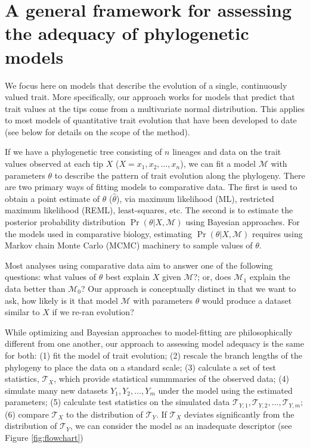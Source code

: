 \section{A general framework for assessing the adequacy of phylogenetic models}

We focus here on models that describe the evolution of a single, continuously valued trait. More specifically, our approach works for models that predict that trait values at the tips come from a multivariate normal distribution. This applies to most models of quantitative trait evolution that have been developed to date (see below for details on the scope of the method).

If we have a phylogenetic tree consisting of $n$ lineages and data on the trait values observed at each tip $X$ ($X=x_1, x_2, \ldots, x_n$), we can fit a model $\mathcal{M}$ with parameters $\theta$ to describe the pattern of trait evolution along the phylogeny. There are two primary ways of fitting models to comparative data. The first is used to obtain a point estimate of $\theta$ ($\hat \theta$), via maximum likelihood (ML), restricted maximum likelihood (REML), least-squares, etc. The second is to estimate the posterior probability distribution $\Pr(\theta|X, \mathcal{M})$ using Bayesian approaches.
For the models used in comparative biology, estimating $\Pr(\theta|X, \mathcal{M})$ requires using Markov chain Monte Carlo (MCMC) machinery to sample values of $\theta$.

Most analyses using comparative data aim to answer one of the following questions: what values of $\theta$ best explain $X$ given $\mathcal{M}$?; or, does $\mathcal{M}_1$ explain the data better than $\mathcal{M}_0$? 
Our approach is conceptually distinct in that we want to ask, how likely is it that model $\mathcal{M}$ with parameters $\theta$ would produce a dataset similar to $X$ if we re-ran evolution?   

While optimizing and Bayesian approaches to model-fitting are philosophically different from one another, our approach to assessing model adequacy is the same for both: (1) fit the model of trait evolution; (2) rescale the branch lengths of the phylogeny to place the data on a standard scale; (3) calculate a set of test statistics, $\mathcal{T}_X$, which provide statistical summmaries of the observed data; (4) simulate many new datasets $Y_1, Y_2, \ldots, Y_m$ under the model using the estimated parameters; (5) calculate test statistics on the simulated data $\mathcal{T}_{Y,1}, \mathcal{T}_{Y,2}, \ldots, \mathcal{T}_{Y,m}$; (6) compare $\mathcal{T}_X$ to the distribution of $\mathcal{T}_Y$. If $\mathcal{T}_X$ deviates significantly from the distribution of $\mathcal{T}_Y$, we can consider the model as an inadequate descriptor (see Figure \ref{fig:flowchart})

